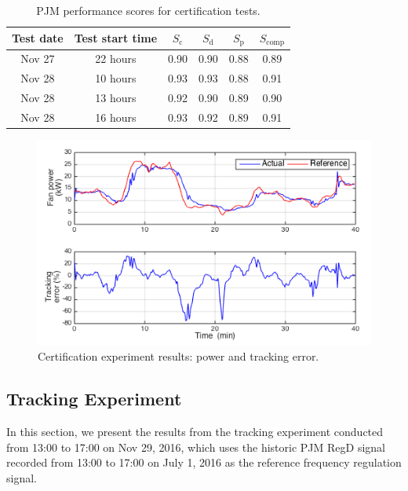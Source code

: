 \begin{table}[b]
\centering
\begin{tabular}{c | c | c c c | c}
\toprule
Test date & Test start time & $S_\text{c}$ & $S_\text{d}$ & $S_\text{p}$ & $S_\text{comp}$  \\ \hline
Nov 27 & 22 hours & 0.90 & 0.90 & 0.88 & 0.89\\
Nov 28 & 10 hours & 0.93 & 0.93 & 0.88 & 0.91 \\
Nov 28 & 13 hours & 0.92 & 0.90 & 0.89 & 0.90 \\
Nov 28 & 16 hours & 0.93 & 0.92 & 0.89 & 0.91 \\
\bottomrule
\end{tabular}
\caption{PJM performance scores for certification tests.}
\label{tab:certification}
\end{table}

\begin{figure}[t]
\centering
\includegraphics[scale=0.7]{chapters/building_exp/figures/Cert_power.png}
\caption{Certification experiment results: power and tracking error.}
\label{fig:cert_power}
\end{figure}



\subsection{Tracking Experiment}\label{sec:tracking_exp}
In this section, we present the results from the tracking experiment conducted from 13:00 to 17:00 on Nov 29, 2016, which uses the historic PJM RegD signal recorded from 13:00 to 17:00 on July 1, 2016 \cite{PJM_signal_price} as the reference frequency regulation signal.

